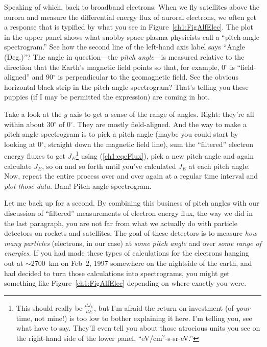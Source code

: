 
Speaking of which, back to broadband electrons. When we fly satellites
above the aurora and measure the differential energy flux of auroral
electrons, we often get a response that is typified by what you see in
Figure~\ref{ch1:FigAlfElec}. The plot in the upper panel shows what
snobby space plasma physicists call a ``pitch-angle spectrogram.''
See how the second line of the left-hand axis label says ``Angle
(Deg.)''?  The angle in question---the \emph{pitch angle}---is
measured relative to the direction that the Earth's magnetic field
points so that, for example, 0$^\circ$ is ``field-aligned'' and
90$^\circ$ is perpendicular to the geomagnetic field. See the obvious
horizontal black strip in the pitch-angle spectrogram? That's telling
you these puppies (if I may be permitted the expression) are coming in
hot.

Take a look at the $y$ axis to get a sense of the range of angles. Right:
they're all within about 30$^\circ$ of 0$^\circ$. They are mostly
field-aligned. And the way to make a pitch-angle spectrogram is to pick a pitch
angle (maybe you could start by looking at 0$^\circ$, straight down the magnetic
field line), sum the ``filtered'' electron energy fluxes to get
$J_E$\footnote{This should really be $\frac{dJ_E}{dE}$, but I'm afraid the
  return on investment (of \emph{your} time, not mine!) is too low to bother
  explaining it here. I'm telling you, see what \citet{Bruno2013} have to
  say. They'll even tell you about those atrocious units you see on the
  right-hand side of the lower panel, ``eV/cm$^2$-s-sr-eV.''} using
(\ref{ch1:eqeFlux}), pick a new pitch angle and again calculate $J_E$, so on and
so forth until you've calculated $J_E$ at each pitch angle. Now, repeat the
entire process over and over again at a regular time interval and \emph{plot
  those data.} Bam!  Pitch-angle spectrogram.

Let me back up for a second. By combining this business of pitch angles with our
discussion of ``filtered'' measurements of electron energy flux, the way we did
in the last paragraph, you are not far from what we actually do with particle
detectors on rockets and satellites. The goal of these detectors is to measure
\emph{how many particles} (electrons, in our case) at \emph{some pitch angle}
and over \emph{some range of energies}. If you had made these types of
calculations for the electrons hanging out at $\sim$2700~km on Feb~2, 1997
somewhere on the nightside of the earth, and had decided to turn those
calculations into spectrograms, you might get something like
Figure~\ref{ch1:FigAlfElec} depending on where exactly you were.


